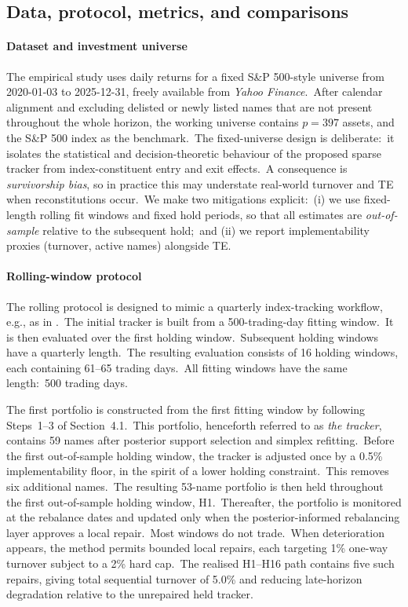 \documentclass[11pt]{article}
\begin{document}
\subsection{Data, protocol, metrics, and comparisons}\label{subsec:case-data}


\paragraph{Dataset and investment universe}

The empirical study uses daily returns for a fixed S\&P 500-style universe from 2020-01-03 to 2025-12-31, freely available from \emph{Yahoo Finance}.\ After calendar alignment and excluding delisted or newly listed names that are not present throughout the whole horizon, the working universe contains $p=397$ assets, and the S\&P 500 index as the benchmark.\ The fixed-universe design is deliberate:\ it isolates the statistical and decision-theoretic behaviour of the proposed sparse tracker from index-constituent entry and exit effects.\ A consequence is \emph{survivorship bias}, so in practice this may understate real-world turnover and TE when reconstitutions occur.\ We make two mitigations explicit:\ (i) we use fixed-length rolling fit windows and fixed hold periods, so that all estimates are \emph{out-of-sample} relative to the subsequent hold;\ and (ii) we report implementability proxies (turnover, active names) alongside TE.

\paragraph{Rolling-window protocol}

The rolling protocol is designed to mimic a quarterly index-tracking workflow, e.g., as in \cite{dhingra2026index}.\ The initial tracker is built from a 500-trading-day fitting window.\ It is then evaluated over the first holding window.\ Subsequent holding windows have a quarterly length.\ The resulting evaluation consists of 16 holding windows, each containing 61--65 trading days.\ All fitting windows have the same length:\ 500 trading days.

The first portfolio is constructed from the first fitting window by following Steps~1--3 of Section~4.1.\ This portfolio, henceforth referred to as \emph{the tracker}, contains 59 names after posterior support selection and simplex refitting.\ Before the first out-of-sample holding window, the tracker is adjusted once by a 0.5\% implementability floor, in the spirit of a lower holding constraint.\ This removes six additional names.\ The resulting 53-name portfolio is then held throughout the first out-of-sample holding window, H1.\ Thereafter, the portfolio is monitored at the rebalance dates and updated only when the posterior-informed rebalancing layer approves a local repair.\ Most windows do not trade.\ When deterioration appears, the method permits bounded local repairs, each targeting 1\% one-way turnover subject to a 2\% hard cap.\ The realised H1--H16 path contains five such repairs, giving total sequential turnover of 5.0\% and reducing late-horizon degradation relative to the unrepaired held tracker.
\end{document}
